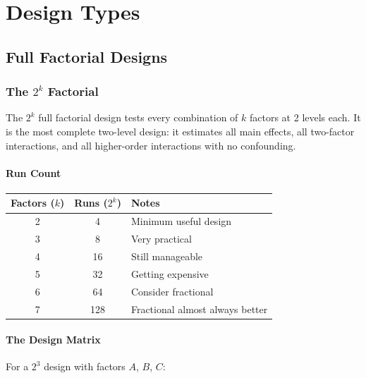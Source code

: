 \documentclass[11pt]{book}
\begin{document}
\part{Design Types}

\chapter{Full Factorial Designs}

\section{The $2^k$ Factorial}

The $2^k$ full factorial design tests every combination of $k$ factors at 2
levels each. It is the most complete two-level design: it estimates all main
effects, all two-factor interactions, and all higher-order interactions with no
confounding.

\subsection{Run Count}

\begin{center}
\begin{tabular}{ccl}
\toprule
Factors ($k$) & Runs ($2^k$) & Notes \\
\midrule
2 & 4  & Minimum useful design \\
3 & 8  & Very practical \\
4 & 16 & Still manageable \\
5 & 32 & Getting expensive \\
6 & 64 & Consider fractional \\
7 & 128 & Fractional almost always better \\
\bottomrule
\end{tabular}
\end{center}

\subsection{The Design Matrix}

For a $2^3$ design with factors $A$, $B$, $C$:
\end{document}
